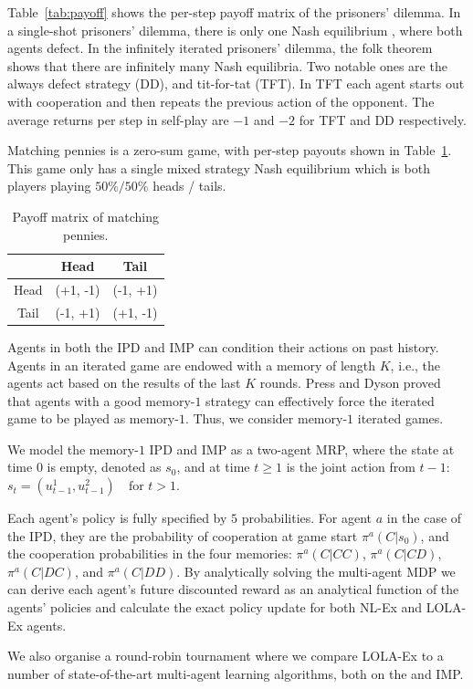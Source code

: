 Table~\ref{tab:payoff} shows the per-step payoff matrix of the prisoners' dilemma. In a single-shot prisoners' dilemma, there is only one Nash equilibrium \cite{fudenberg1991game}, where both agents defect. In the infinitely iterated prisoners' dilemma, the folk theorem \citep{roger1991game} shows that there are infinitely many Nash equilibria. Two notable ones are the always defect strategy (DD), and tit-for-tat (TFT). In TFT each agent starts out with cooperation and then repeats the previous action of the opponent. The average returns per step in self-play are $-1$ and $-2$ for TFT and DD respectively. 

Matching pennies \cite{gibbons1992game} is a zero-sum game, with per-step payouts shown in Table~\ref{tab:pennies-payoff}. This game only has a single mixed strategy Nash equilibrium which is both players playing $50\% / 50\%$ heads / tails.  

\begin{table}[h!]
\begin{center}
\begin{tabular}{c|c|c}
\hline
 & Head & Tail \\
\hline
Head & (+1, -1) & (-1, +1) \\
\hline
Tail & (-1, +1) & (+1, -1)  \\
\hline
\end{tabular}
\end{center}
\caption{Payoff matrix of matching pennies.}
\label{tab:pennies-payoff}
\vspace{-3ex}
\end{table}

Agents in both the IPD and IMP can condition their actions on past history. Agents in an iterated game are endowed with a memory of length $K$, i.e., the agents act based on the results of the last $K$ rounds. Press and Dyson \cite{press2012iterated} proved that agents with a good memory-$1$ strategy can effectively force the iterated game to be played as memory-$1$. Thus, we consider memory-$1$ iterated games. 

We model the memory-$1$ IPD and IMP as a two-agent MRP, where the state at time $0$ is empty, denoted as $s_0$, and at time $t\geq1$ is the joint action from $t-1$:
    $s_t= (u^1_{t-1}, u^2_{t-1}) \quad \text{for $t>1$}$.

Each agent's policy is fully specified by $5$ probabilities. For agent $a$ in the case of the IPD, they are the probability of cooperation at game start $\pi^a(C|s_0)$, and the cooperation probabilities in the four memories: $\pi^a(C|CC)$, $\pi^a(C|CD)$, $\pi^a(C|DC)$, and $\pi^a(C|DD)$. By analytically solving the multi-agent MDP we can derive each agent's future discounted reward as an analytical function of the agents' policies  and calculate the exact policy update for both NL-Ex and LOLA-Ex agents.

We also organise a round-robin tournament where we compare LOLA-Ex to a number of state-of-the-art multi-agent learning algorithms, both on the  and IMP. 

